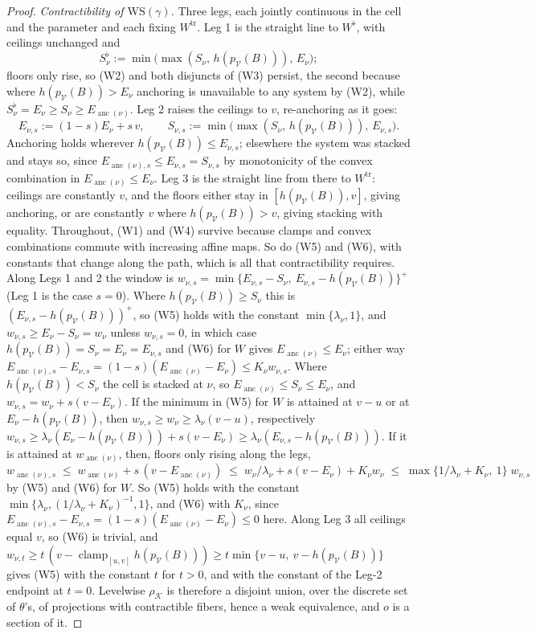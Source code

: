 \documentclass[12pt]{amsart}
\theoremstyle{definition}
\theoremstyle{remark}
\newcommand{\Cal}[1]{\mathcal{#1}}
\newcommand{\Kop}{\mathcal{K}}                   %
\newcommand{\anc}{\operatorname{anc}}            %
\begin{document}
\begin{proof}
\emph{Contractibility of $\mathrm{WS}(\gamma)$.} Three legs, each jointly continuous in the cell and the parameter and each fixing $W^{\mathrm{tr}}$. Leg 1 is the straight line to $W^{\flat}$, with ceilings unchanged and
\[S^{\flat}_\nu := \min\big(\max(S_\nu,\, h(p_{\Cal{V}}(B))),\, E_\nu\big);\]
floors only rise, so (W2) and both disjuncts of (W3) persist, the second because where $h(p_{\Cal{V}}(B)) > E_\nu$ anchoring is unavailable to any system by (W2), while $S^{\flat}_\nu = E_\nu\geq S_\nu\geq E_{\anc(\nu)}$. Leg 2 raises the ceilings to $v$, re-anchoring as it goes:
\[ E_{\nu,s} := (1-s)E_\nu + s\,v, \quad\quad S_{\nu,s} := \min\big( \max(S_\nu,\, h(p_{\Cal{V}}(B))),\, E_{\nu,s}\big).\]
Anchoring holds wherever $h(p_{\Cal{V}}(B))\leq E_{\nu,s}$; elsewhere the system was stacked and stays so, since $E_{\anc(\nu),s}\leq E_{\nu,s} = S_{\nu,s}$ by monotonicity of the convex combination in $E_{\anc(\nu)}\leq E_\nu$. Leg 3 is the straight line from there to $W^{\mathrm{tr}}$: ceilings are constantly $v$, and the floors either stay in $[h(p_{\Cal{V}}(B)),v]$, giving anchoring, or are constantly $v$ where $h(p_{\Cal{V}}(B))>v$, giving stacking with equality. Throughout, (W1) and (W4) survive because clamps and convex combinations commute with increasing affine maps. So do (W5) and (W6), with constants that change along the path, which is all that contractibility requires. Along Legs 1 and 2 the window is $w_{\nu,s} = \min\{E_{\nu,s} - S_\nu,\ E_{\nu,s} - h(p_{\Cal V}(B))\}^{+}$ (Leg 1 is the case $s=0$). Where $h(p_{\Cal V}(B))\geq S_\nu$ this is $(E_{\nu,s} - h(p_{\Cal V}(B)))^{+}$, so (W5) holds with the constant $\min\{\lambda_\nu, 1\}$, and $w_{\nu,s}\geq E_\nu - S_\nu = w_\nu$ unless $w_{\nu,s} = 0$, in which case $h(p_{\Cal V}(B)) = S_\nu = E_\nu = E_{\nu,s}$ and (W6) for $W$ gives $E_{\anc(\nu)}\leq E_\nu$; either way $E_{\anc(\nu),s} - E_{\nu,s} = (1-s)(E_{\anc(\nu)} - E_\nu)\leq K_\nu w_{\nu,s}$. Where $h(p_{\Cal V}(B)) < S_\nu$ the cell is stacked at $\nu$, so $E_{\anc(\nu)}\leq S_\nu\leq E_\nu$, and $w_{\nu,s} = w_\nu + s(v-E_\nu)$. If the minimum in (W5) for $W$ is attained at $v-u$ or at $E_\nu - h(p_{\Cal V}(B))$, then $w_{\nu,s}\geq w_\nu\geq\lambda_\nu(v-u)$, respectively $w_{\nu,s}\geq \lambda_\nu(E_\nu - h(p_{\Cal V}(B))) + s(v-E_\nu)\geq \lambda_\nu(E_{\nu,s} - h(p_{\Cal V}(B)))$. If it is attained at $w_{\anc(\nu)}$, then, floors only rising along the legs,
\[ w_{\anc(\nu),s} \;\leq\; w_{\anc(\nu)} + s\,(v - E_{\anc(\nu)}) \;\leq\; w_\nu/\lambda_\nu + s(v-E_\nu) + K_\nu w_\nu \;\leq\; \max\{1/\lambda_\nu + K_\nu,\ 1\}\; w_{\nu,s}\]
by (W5) and (W6) for $W$. So (W5) holds with the constant $\min\{\lambda_\nu, (1/\lambda_\nu + K_\nu)^{-1}, 1\}$, and (W6) with $K_\nu$, since $E_{\anc(\nu),s} - E_{\nu,s} = (1-s)(E_{\anc(\nu)} - E_\nu) \leq 0$ here. Along Leg 3 all ceilings equal $v$, so (W6) is trivial, and $w_{\nu,t}\geq t\,(v - \operatorname{clamp}_{[u,v]}h(p_{\Cal V}(B)))\geq t\min\{v-u,\ v-h(p_{\Cal V}(B))\}$ gives (W5) with the constant $t$ for $t>0$, and with the constant of the Leg-2 endpoint at $t=0$. Levelwise $\rho_{\Kop}$ is therefore a disjoint union, over the discrete set of $\theta$'s, of projections with contractible fibers, hence a weak equivalence, and $o$ is a section of it.
\end{proof}
\end{document}
